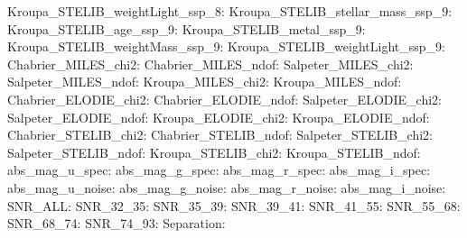Kroupa\_STELIB\_weightLight\_ssp\_8:  \newline 
Kroupa\_STELIB\_stellar\_mass\_ssp\_9:  \newline 
Kroupa\_STELIB\_age\_ssp\_9:  \newline 
Kroupa\_STELIB\_metal\_ssp\_9:  \newline 
Kroupa\_STELIB\_weightMass\_ssp\_9:  \newline 
Kroupa\_STELIB\_weightLight\_ssp\_9:  \newline 
Chabrier\_MILES\_chi2:  \newline 
Chabrier\_MILES\_ndof:  \newline 
Salpeter\_MILES\_chi2:  \newline 
Salpeter\_MILES\_ndof:  \newline 
Kroupa\_MILES\_chi2:  \newline 
Kroupa\_MILES\_ndof:  \newline 
Chabrier\_ELODIE\_chi2:  \newline 
Chabrier\_ELODIE\_ndof:  \newline 
Salpeter\_ELODIE\_chi2:  \newline 
Salpeter\_ELODIE\_ndof:  \newline 
Kroupa\_ELODIE\_chi2:  \newline 
Kroupa\_ELODIE\_ndof:  \newline 
Chabrier\_STELIB\_chi2:  \newline 
Chabrier\_STELIB\_ndof:  \newline 
Salpeter\_STELIB\_chi2:  \newline 
Salpeter\_STELIB\_ndof:  \newline 
Kroupa\_STELIB\_chi2:  \newline 
Kroupa\_STELIB\_ndof:  \newline 
abs\_mag\_u\_spec:  \newline 
abs\_mag\_g\_spec:  \newline 
abs\_mag\_r\_spec:  \newline 
abs\_mag\_i\_spec:  \newline 
abs\_mag\_u\_noise:  \newline 
abs\_mag\_g\_noise:  \newline 
abs\_mag\_r\_noise:  \newline 
abs\_mag\_i\_noise:  \newline 
SNR\_ALL:  \newline 
SNR\_32\_35:  \newline 
SNR\_35\_39:  \newline 
SNR\_39\_41:  \newline 
SNR\_41\_55:  \newline 
SNR\_55\_68:  \newline 
SNR\_68\_74:  \newline 
SNR\_74\_93:  \newline 
Separation:  \newline 
